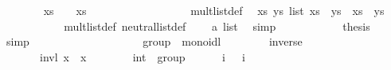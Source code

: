 \begin{isabellebody}
\ \ \ \ \ \ \isamarkupfalse%
\ {\isachardoublequoteopen}xs\ {\isasymotimes}\ {\isasymone}\ {\isacharequal}\ xs{\isachardoublequoteclose}\isanewline
\ \ \ \ \ \ \isamarkupfalse%
\ {\isacharminus}\isanewline
\ \ \ \ \ \ \ \ \isamarkupfalse%
\ mult{\isacharunderscore}list{\isacharunderscore}def\ \isamarkupfalse%
\ {\isachardoublequoteopen}{\isasymAnd}xs\ ys{\isasymColon}{\isasymalpha}\ list{\isachardot}\ xs\ {\isasymotimes}\ ys\ {\isasymequiv}\ xs\ {\isacharat}\ ys{\isachardoublequoteclose}\ \isacommand{{\isachardot}}\isamarkupfalse%
\isanewline
\ \ \ \ \ \ \ \ \isamarkupfalse%
\ \isamarkupfalse%
\ mult{\isacharunderscore}list{\isacharunderscore}def\ neutral{\isacharunderscore}list{\isacharunderscore}def\ \isamarkupfalse%
\ {\isachardoublequoteopen}{\isasymone}\ {\isasymequiv}\ {\isacharbrackleft}{\isacharbrackright}{\isasymColon}{\isacharprime}a\ list{\isachardoublequoteclose}\ \isamarkupfalse%
\ simp\isanewline
\ \ \ \ \ \ \ \ \isamarkupfalse%
\ \isamarkupfalse%
\ {\isacharquery}thesis\ \isamarkupfalse%
\ simp\isanewline
\ \ \ \ \ \ \isamarkupfalse%
\isanewline
\ \ \ \ \isamarkupfalse%
%
\endisatagproof
{\isafoldproof}%
%
\isadelimproof
\ \ \isanewline
%
\endisadelimproof
\isanewline
\ \ \ \ \isamarkupfalse%
\ group\ {\isacharequal}\ monoidl\ {\isacharplus}\isanewline
\ \ \ \ \ \ \ inverse\ {\isacharcolon}{\isacharcolon}\ {\isachardoublequoteopen}{\isasymalpha}\ {\isasymRightarrow}\ {\isasymalpha}{\isachardoublequoteclose}\ \ \ \ {\isacharparenleft}{\isachardoublequoteopen}{\isacharparenleft}{\isacharunderscore}\isactrlloc {\isasymdiv}{\isacharparenright}{\isachardoublequoteclose}\ {\isacharbrackleft}{}{}{}{}{\isacharbrackright}\ {}{}{}{\isacharparenright}\isanewline
\ \ \ \ \ \ \ invl{\isacharcolon}\ {\isachardoublequoteopen}x\isactrlloc {\isasymdiv}\ \isactrlloc {\isasymotimes}\ x\ {\isacharequal}\ \isactrlloc {\isasymone}{\isachardoublequoteclose}\isanewline
\isanewline
\ \ \ \ \isamarkupfalse%
\ int\ {\isacharcolon}{\isacharcolon}\ group\isanewline
\ \ \ \ \ \ {\isachardoublequoteopen}i{\isasymdiv}\ {\isasymequiv}\ {\isacharminus}\ i{\isachardoublequoteclose}\isanewline
%
\isadelimproof
\ \ \ \ %
\endisadelimproof
%
\isatagproof
{}\isamarkupfalse%
\isanewline

\end{isabellebody}
